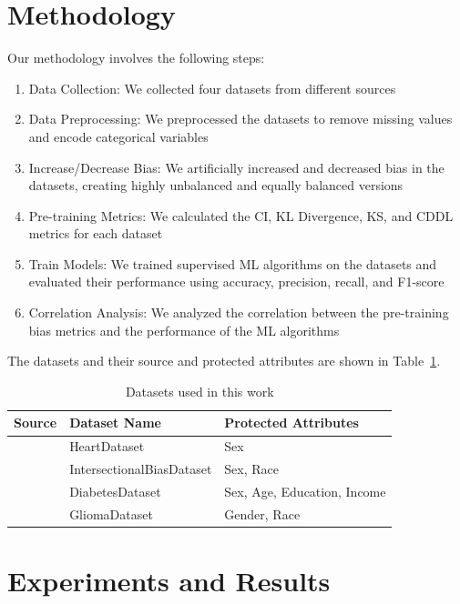 \documentclass[12pt]{article}
\begin{document}
\section{Methodology}
Our methodology involves the following steps:
\begin{enumerate}
    \item Data Collection: We collected four datasets from different sources
    \item Data Preprocessing: We preprocessed the datasets to remove missing values and encode categorical variables
    \item Increase/Decrease Bias: We artificially increased and decreased bias in the datasets, creating highly unbalanced and equally balanced versions
    \item Pre-training Metrics: We calculated the CI, KL Divergence, KS, and CDDL metrics for each dataset
    \item Train Models: We trained supervised ML algorithms on the datasets and evaluated their performance using accuracy, precision, recall, and F1-score
    \item Correlation Analysis: We analyzed the correlation between the pre-training bias metrics and the performance of the ML algorithms
\end{enumerate}

The datasets and their source and protected attributes are shown in Table~\ref{tab:datasets}.


\begin{table}[h]
  \begin{tabular}{@{}lll@{}}
  \toprule
  Source                                           & Dataset Name              & Protected Attributes        \\ \midrule
  \cite{UCI}                                       & HeartDataset              & Sex                         \\
  \cite{INTERSECTIONAL}                            & IntersectionalBiasDataset & Sex, Race                   \\
  \cite{CDC_Diabetes_Health_Indicators}            & DiabetesDataset           & Sex, Age, Education, Income \\ 
  \cite{Glioma_Grading_Clinical_Mutation_Features} & GliomaDataset             & Gender, Race                \\ \bottomrule
  \end{tabular}
  \caption{Datasets used in this work}
  \label{tab:datasets}
\end{table}
\section{Experiments and Results}
\end{document}
